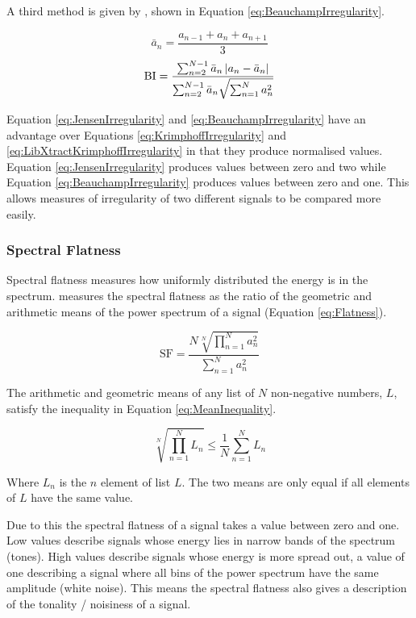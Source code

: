 			A third method is given by \citet{beauchamp2007analysis}, shown in Equation
			\ref{eq:BeauchampIrregularity}.

			\[ \bar{a}_{n} = \frac{a_{n-1} + a_{n} + a_{n+1}}{3} \]
			\begin{equation}
				\textrm{BI} = \frac{\sum_{n = 2}^{N - 1} \bar{a}_{n} \left|a_{n} - \bar{a}_{n}\right|}
						   {\sum_{n = 2}^{N - 1} \bar{a}_{n} \sqrt{\sum_{n = 1}^{N} a_{n}^{2}}}
				\label{eq:BeauchampIrregularity}
			\end{equation}

			Equation \ref{eq:JensenIrregularity} and \ref{eq:BeauchampIrregularity} have an advantage over
			Equations \ref{eq:KrimphoffIrregularity} and \ref{eq:LibXtractKrimphoffIrregularity} in that they
			produce normalised values. Equation \ref{eq:JensenIrregularity} produces values between zero and two
			while Equation \ref{eq:BeauchampIrregularity} produces values between zero and one. This allows
			measures of irregularity of two different signals to be compared more easily.

		\subsubsection*{Spectral Flatness}
			Spectral flatness measures how uniformly distributed the energy is in the spectrum.
			\citet{johnston1988transform} measures the spectral flatness as the ratio of the geometric and
			arithmetic means of the power spectrum of a signal (Equation \ref{eq:Flatness}).

			\begin{equation}
				\textrm{SF} = \frac{N\sqrt[N]{\prod_{n = 1}^{N} a_{n}^{2}}}
						   {\sum_{n = 1}^{N} a_{n}^{2}}
				\label{eq:Flatness}
			\end{equation}

			The arithmetic and geometric means of any list of $N$ non-negative numbers, $L$, satisfy the
			inequality in Equation \ref{eq:MeanInequality}.

			\begin{equation}
				\sqrt[N]{\prod_{n = 1}^{N} L_{n}} \leq \frac{1}{N} \sum_{n = 1}^{N} L_{n}
				\label{eq:MeanInequality}
			\end{equation}

			Where $L_{n}$ is the $n$ element of list $L$. The two means are only equal if all elements
			of $L$ have the same value.

			Due to this the spectral flatness of a signal takes a value between zero and one. Low values
			describe signals whose energy lies in narrow bands of the spectrum (tones). High values describe
			signals whose energy is more spread out, a value of one describing a signal where all bins of the
			power spectrum have the same amplitude (white noise). This means the spectral flatness also gives a
			description of the tonality / noisiness of a signal.

